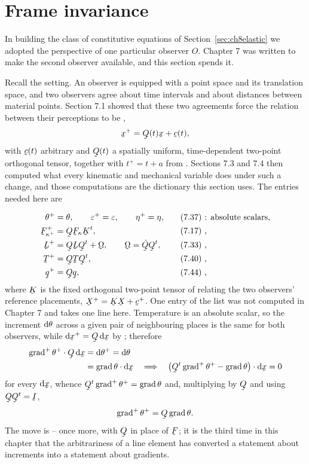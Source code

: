 \section{Frame invariance}\label{sec:ch8frame}

In building the class of constitutive equations of
Section~\ref{sec:ch8elastic} we adopted the perspective of one
particular observer $O$. Chapter 7 was written to make the second
observer available, and this section spends it.

Recall the setting. An observer is equipped with a point space and its
translation space, and two observers agree about time intervals and
about distances between material points. Section 7.1 showed that these
two agreements force the relation between their perceptions to be
,
\[
   \bx^{+}=\bQ(t)\bx+\bc(t),
\]
with $\bc(t)$ arbitrary and $\bQ(t)$ a spatially uniform, time-dependent
two-point orthogonal tensor, together with $t^{+}=t+a$ from .
Sections 7.3 and 7.4 then computed what every kinematic and mechanical
variable does under such a change, and those computations are the
dictionary this section uses. The entries needed here are

\[
\begin{aligned}
   \theta^{+}&=\theta,\qquad \eps^{+}=\eps,\qquad \eta^{+}=\eta,
     &&\text{\eqr{7.37}: absolute scalars,}\\
   \bF^{+}_{\kappa^{+}}&=\bQ\bF_{\kappa}\bK^{t},
     &&\text{\eqr{7.17},}\\
   \bL^{+}&=\bQ\bL\bQ^{t}+\bOm,\qquad \bOm=\dot\bQ\bQ^{t},
     &&\text{\eqr{7.33},}\\
   \bT^{+}&=\bQ\bT\bQ^{t},
     &&\text{\eqr{7.40},}\\
   \bq^{+}&=\bQ\bq,
     &&\text{\eqr{7.44},}
\end{aligned}
\]
where $\bK$ is the fixed orthogonal two-point tensor of 
relating the two observers' reference placements, $\bX^{+}=\bK\bX+
\bc^{+}$. One entry of the list  was not computed in Chapter 7
and takes one line here. Temperature is an absolute scalar, so the
increment $\mathrm{d}\theta$ across a given pair of neighbouring places is the
same for both observers, while $\dl\bx^{+}=\bQ\,\dl\bx$ by ;
therefore
\[
\begin{aligned}
   \ip{\grad^{+}\theta^{+}}{\bQ\,\dl\bx}
   &=\dl\theta^{+}=\dl\theta
   \\
   &=\ip{\grad\theta}{\dl\bx}
   \quad\Longrightarrow\quad
   \ip{\big(\bQ^{t}\grad^{+}\theta^{+}-\grad\theta\big)}{\dl\bx}=0
\end{aligned}
\]
for every $\dl\bx$, whence $\bQ^{t}\grad^{+}\theta^{+}=\grad\theta$ and,
multiplying by $\bQ$ and using $\bQ\bQ^{t}=\I$,
\[
   \grad^{+}\theta^{+}=\bQ\grad\theta .
\]
The move is -- once more, with $\bQ$ in place of
$\bF$; it is the third time in this chapter that the arbitrariness of a
line element has converted a statement about increments into a statement
about gradients.

